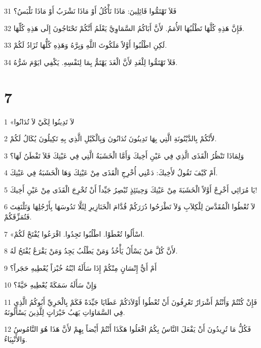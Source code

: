 \par 31 فَلاَ تَهْتَمُّوا قَائِلِينَ: مَاذَا نَأْكُلُ أَوْ مَاذَا نَشْرَبُ أَوْ مَاذَا نَلْبَسُ؟
\par 32 فَإِنَّ هَذِهِ كُلَّهَا تَطْلُبُهَا الأُمَمُ. لأَنَّ أَبَاكُمُ السَّمَاوِيَّ يَعْلَمُ أَنَّكُمْ تَحْتَاجُونَ إِلَى هَذِهِ كُلِّهَا.
\par 33 لَكِنِ اطْلُبُوا أَوَّلاً مَلَكُوتَ اللَّهِ وَبِرَّهُ وَهَذِهِ كُلُّهَا تُزَادُ لَكُمْ.
\par 34 فَلاَ تَهْتَمُّوا لِلْغَدِ لأَنَّ الْغَدَ يَهْتَمُّ بِمَا لِنَفْسِهِ. يَكْفِي ايَوْمَ شَرُّهُ.

\chapter{7}

\par 1 «لاَ تَدِينُوا لِكَيْ لاَ تُدَانُوا
\par 2 لأَنَّكُمْ بِالدَّيْنُونَةِ الَّتِي بِهَا تَدِينُونَ تُدَانُونَ وَبِالْكَيْلِ الَّذِي بِهِ تَكِيلُونَ يُكَالُ لَكُمْ.
\par 3 وَلِمَاذَا تَنْظُرُ الْقَذَى الَّذِي فِي عَيْنِ أَخِيكَ وَأَمَّا الْخَشَبَةُ الَّتِي فِي عَيْنِكَ فَلاَ تَفْطَنُ لَهَا؟
\par 4 أَمْ كَيْفَ تَقُولُ لأَخِيكَ: دَعْنِي أُخْرِجِ الْقَذَى مِنْ عَيْنِكَ وَهَا الْخَشَبَةُ فِي عَيْنِكَ.
\par 5 يَا مُرَائِي أَخْرِجْ أَوَّلاً الْخَشَبَةَ مِنْ عَيْنِكَ وَحِينَئِذٍ تُبْصِرُ جَيِّداً أَنْ تُخْرِجَ الْقَذَى مِنْ عَيْنِ أَخِيكَ!
\par 6 لاَ تُعْطُوا الْمُقَدَّسَ لِلْكِلاَبِ وَلاَ تَطْرَحُوا دُرَرَكُمْ قُدَّامَ الْخَنَازِيرِ لِئَلَّا تَدُوسَهَا بِأَرْجُلِهَا وَتَلْتَفِتَ فَتُمَزِّقَكُمْ.
\par 7 «اسْأَلُوا تُعْطَوْا. اطْلُبُوا تَجِدُوا. اقْرَعُوا يُفْتَحْ لَكُمْ.
\par 8 لأَنَّ كُلَّ مَنْ يَسْأَلُ يَأْخُذُ وَمَنْ يَطْلُبُ يَجِدُ وَمَنْ يَقْرَعُ يُفْتَحُ لَهُ.
\par 9 أَمْ أَيُّ إِنْسَانٍ مِنْكُمْ إِذَا سَأَلَهُ ابْنُهُ خُبْزاً يُعْطِيهِ حَجَراً؟
\par 10 وَإِنْ سَأَلَهُ سَمَكَةً يُعْطِيهِ حَيَّةً؟
\par 11 فَإِنْ كُنْتُمْ وَأَنْتُمْ أَشْرَارٌ تَعْرِفُونَ أَنْ تُعْطُوا أَوْلاَدَكُمْ عَطَايَا جَيِّدَةً فَكَمْ بِالْحَرِيِّ أَبُوكُمُ الَّذِي فِي السَّمَاوَاتِ يَهَبُ خَيْرَاتٍ لِلَّذِينَ يَسْأَلُونَهُ.
\par 12 فَكُلُّ مَا تُرِيدُونَ أَنْ يَفْعَلَ النَّاسُ بِكُمُ افْعَلُوا هَكَذَا أَنْتُمْ أَيْضاً بِهِمْ لأَنَّ هَذَا هُوَ النَّامُوسُ وَالأَنْبِيَاءُ.

